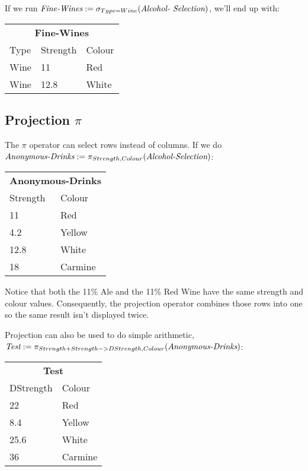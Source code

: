If we run $\text{\it Fine-Wines}:=\sigma_{Type=Wine}(\text{\it Alcohol-
Selection})$, we'll end up with:

\begin{center}
  \begin{tabular}{lll}
    \multicolumn{3}{c}{\textbf{Fine-Wines}}\\
    {Type} & {Strength} & {Colour}\\ \hline
    Wine          & 11                & Red\\
    Wine          & 12.8              & White\\
  \end{tabular}
\end{center}

\subsection{Projection $\pi$}

The $\pi$ operator can select rows instead of columns. If we do $\text{\it
Anonymous-Drinks} := \pi_{Strength, Colour}(\text{\it Alcohol-Selection})$:

\begin{center}
  \begin{tabular}{ll}
    \multicolumn{2}{c}{\textbf{Anonymous-Drinks}}\\
    {Strength} & {Colour}\\ \hline
    11         & Red\\
    4.2        & Yellow\\
    12.8       & White\\
    18         & Carmine\\
  \end{tabular}
\end{center}

Notice that both the 11\% Ale and the 11\% Red Wine have the same strength and
colour values. Consequently, the projection operator combines those rows into
one so the same result isn't displayed twice.

Projection can also be used to do simple arithmetic, $\text{\it Test} :=
\pi_{Strength + Strength->DStrength, Colour}(\text{\it Anonymous-Drinks})$:

\begin{center}
  \begin{tabular}{ll}
    \multicolumn{2}{c}{\textbf{Test}}\\
    {DStrength} & {Colour}\\ \hline
    22         & Red\\
    8.4        & Yellow\\
    25.6       & White\\
    36         & Carmine\\
  \end{tabular}
\end{center}

